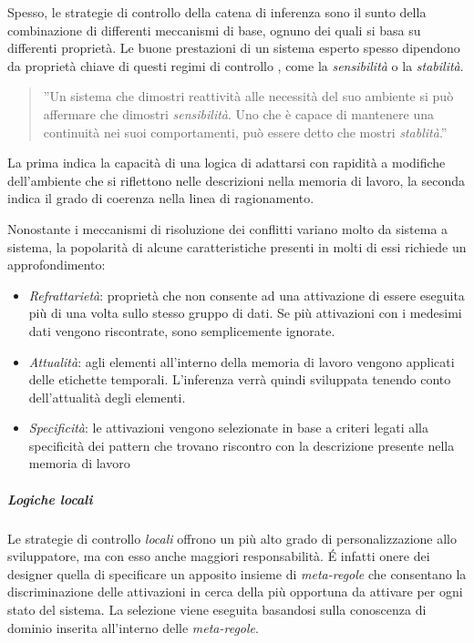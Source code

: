 Spesso, le strategie di controllo della catena di inferenza sono il sunto della combinazione di differenti meccanismi di base, ognuno dei quali si basa su differenti proprietà. Le buone prestazioni di un sistema esperto spesso dipendono da proprietà chiave di questi regimi di controllo \cite{jackson1999}, come la \emph{sensibilità} o la \emph{stabilità}.
\begin{quote}
	''Un sistema che dimostri reattività alle necessità del suo ambiente si può affermare che dimostri \emph{sensibilità}. Uno che è capace di mantenere una continuità nei suoi comportamenti, può essere detto che mostri \emph{stablità}.''~\cite{McDermott:1977:PSC:1045343.1045364}
\end{quote} 
La prima indica la capacità di una logica di adattarsi con rapidità a modifiche dell'ambiente che si riflettono nelle descrizioni nella memoria di lavoro, la seconda indica il grado di coerenza nella linea di ragionamento.~\cite{jackson1999}

Nonostante i meccanismi di risoluzione dei conflitti variano molto da sistema a sistema, la popolarità di alcune caratteristiche presenti in molti di essi richiede un approfondimento:

\begin{itemize}
	\item \emph{Refrattarietà}: proprietà che non consente ad una attivazione di essere eseguita più di una volta sullo stesso gruppo di dati. Se più attivazioni con i medesimi dati vengono riscontrate, sono semplicemente ignorate.
	\item \emph{Attualità}: agli elementi all'interno della memoria di lavoro vengono applicati delle etichette temporali. L'inferenza verrà quindi sviluppata tenendo conto dell'attualità degli elementi.
	\item \emph{Specificità}: le attivazioni vengono selezionate in base a criteri legati alla specificità dei pattern che trovano riscontro con la descrizione presente nella memoria di lavoro
\end{itemize}

\subparagraph{Logiche locali} Le strategie di controllo \emph{locali} offrono un più alto grado di personalizzazione allo sviluppatore, ma con esso anche maggiori responsabilità. \'E infatti onere dei designer quella di specificare un apposito insieme di \emph{meta-regole} che consentano la discriminazione delle attivazioni in cerca della più opportuna da attivare per ogni stato del sistema. La selezione viene eseguita basandosi sulla conoscenza di dominio inserita all'interno delle \emph{meta-regole}.

